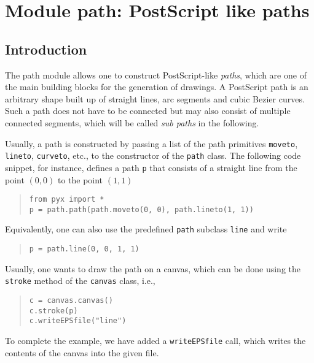 \chapter{Module path: PostScript like paths}

\label{path}

\section{Introduction}

The path module allows one to construct PostScript-like
\textit{paths}, which are one of the main building blocks for the
generation of drawings. A PostScript path is an arbitrary shape built
up of straight lines, arc segments and cubic Bezier curves. Such a
path does not have to be connected but may also consist of multiple
connected segments, which will be called \textit{sub paths} in the
following.

Usually, a path is constructed by passing a list of the path
primitives \verb|moveto|, \verb|lineto|, \verb|curveto|, etc., to the
constructor of the \verb|path| class. The following code snippet, for
instance, defines a path \verb|p| that consists of a straight line
from the point $(0, 0)$ to the point $(1, 1)$
\begin{quote}
\begin{verbatim}
from pyx import *
p = path.path(path.moveto(0, 0), path.lineto(1, 1))
\end{verbatim}
\end{quote}
Equivalently, one can also use the predefined \verb|path| subclass
\verb|line| and write
\begin{quote}
\begin{verbatim}
p = path.line(0, 0, 1, 1)
\end{verbatim}
\end{quote}

Usually, one wants to draw the path on a canvas, which can be done
using the \verb|stroke| method of the \verb|canvas| class, i.e.,
\begin{quote}
\begin{verbatim}
c = canvas.canvas()
c.stroke(p)
c.writeEPSfile("line")
\end{verbatim}
\end{quote}
To complete the example, we have added a \verb|writeEPSfile| call,
which writes the contents of the canvas into the given file.

